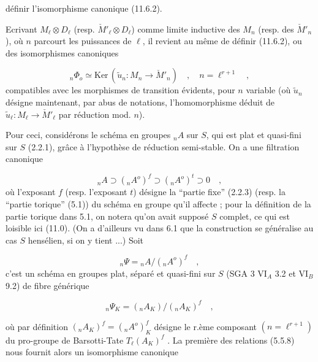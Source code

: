 
définir l'isomorphisme canonique (11.6.2).

Ecrivant $M_\ell \otimes D_\ell$ (resp. $\check{M}'_\ell \otimes D_\ell$) comme limite inductive des $M_n$ (resp. des $\check{M}'_n$), où $n$ parcourt les puissances de $\ell$, il revient au même de définir (11.6.2), ou des isomorphismes canoniques

\begin{equation}\tag{11.6.4}
{}_n\Phi_o \simeq \mathrm{Ker}\,(\tilde{u}_n : M_n \longrightarrow \check{M}'_n) \quad , \quad n = \ell^{r+1} \quad ,
\end{equation}
compatibles avec les morphismes de transition évidents, pour $n$ variable (où $\tilde{u}_n$ désigne maintenant, par abus de notations, l'homomorphisme déduit de $\tilde{u}_\ell : M_\ell \longrightarrow \check{M}'_\ell$ par réduction mod. $n$).

Pour ceci, considérons le schéma en groupes ${}_nA$ sur $S$, qui est plat et quasi-fini sur $S$ (2.2.1), grâce à l'hypothèse de réduction semi-stable. On a une filtration canonique

\begin{equation}\tag{11.6.5}
{}_nA \supset ({}_nA^o)^f \supset ({}_nA^o)^t \supset 0 \quad ,
\end{equation}
où l'exposant $f$ (resp. l'exposant $t$) désigne la ``partie fixe'' (2.2.3) (resp. la ``partie torique'' (5.1)) du schéma en groupe qu'il affecte ; pour la définition de la partie torique dans 5.1, on notera qu'on avait supposé $S$ complet, ce qui est loisible ici (11.0). (On a d'ailleurs vu dans 6.1 que la construction se généralise au cas $S$ hensélien, si on y tient ...) Soit

\begin{equation}\tag{11.6.6}
{}_n\Psi = {}_nA/({}_nA^o)^f \quad ,
\end{equation}
c'est un schéma en groupes plat, séparé et quasi-fini sur $S$ (SGA 3 $\mathrm{VI}_A$ 3.2 et $\mathrm{VI}_B$ 9.2) de fibre générique

\begin{equation*}
{}_n\Psi_K = ({}_nA_K)/({}_nA_K)^f \quad ,
\end{equation*}


où par définition $({}_nA_K)^f = ({}_nA^o)^f_K$ désigne le r.ème composant $(n=\ell^{r+1})$ du pro-groupe de Barsotti-Tate $T_\ell(A_K)^f$ . La première des relations (5.5.8) nous fournit alors un isomorphisme canonique

